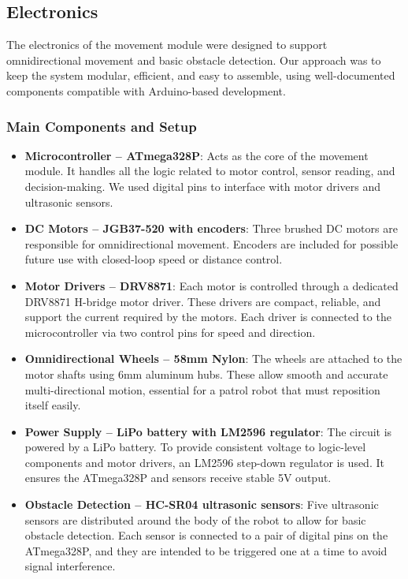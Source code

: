 \subsection{Electronics}

The electronics of the movement module were designed to support omnidirectional movement and basic obstacle detection. Our approach was to keep the system modular, efficient, and easy to assemble, using well-documented components compatible with Arduino-based development.

\subsubsection{Main Components and Setup}

\begin{itemize}
    \item \textbf{Microcontroller – ATmega328P}: Acts as the core of the movement module. It handles all the logic related to motor control, sensor reading, and decision-making. We used digital pins to interface with motor drivers and ultrasonic sensors.
    
    \item \textbf{DC Motors – JGB37-520 with encoders}: Three brushed DC motors are responsible for omnidirectional movement. Encoders are included for possible future use with closed-loop speed or distance control.
    
    \item \textbf{Motor Drivers – DRV8871}: Each motor is controlled through a dedicated DRV8871 H-bridge motor driver. These drivers are compact, reliable, and support the current required by the motors. Each driver is connected to the microcontroller via two control pins for speed and direction.
    
    \item \textbf{Omnidirectional Wheels – 58mm Nylon}: The wheels are attached to the motor shafts using 6mm aluminum hubs. These allow smooth and accurate multi-directional motion, essential for a patrol robot that must reposition itself easily.
    
    \item \textbf{Power Supply – LiPo battery with LM2596 regulator}: The circuit is powered by a LiPo battery. To provide consistent voltage to logic-level components and motor drivers, an LM2596 step-down regulator is used. It ensures the ATmega328P and sensors receive stable 5V output.
    
    \item \textbf{Obstacle Detection – HC-SR04 ultrasonic sensors}: Five ultrasonic sensors are distributed around the body of the robot to allow for basic obstacle detection. Each sensor is connected to a pair of digital pins on the ATmega328P, and they are intended to be triggered one at a time to avoid signal interference.
    

\end{itemize}
